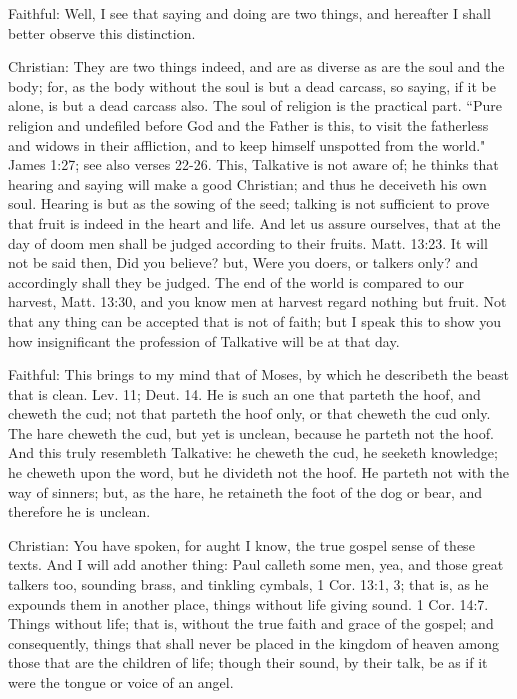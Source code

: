 Faithful: Well, I see that saying and doing are two things, and hereafter I shall better observe this distinction.

Christian: They are two things indeed, and are as diverse as are the soul and the body; for, as the body without the soul is but a dead carcass, so saying, if it be alone, is but a dead carcass also. The soul of religion is the practical part. ``Pure religion and undefiled before God and the Father is this, to visit the fatherless and widows in their affliction, and to keep himself unspotted from the world." James 1:27; see also verses 22-26. This, Talkative is not aware of; he thinks that hearing and saying will make a good Christian; and thus he deceiveth his own soul. Hearing is but as the sowing of the seed; talking is not sufficient to prove that fruit is indeed in the heart and life. And let us assure ourselves, that at the day of doom men shall be judged according to their fruits. Matt. 13:23. It will not be said then, Did you believe? but, Were you doers, or talkers only? and accordingly shall they be judged. The end of the world is compared to our harvest, Matt. 13:30, and you know men at harvest regard nothing but fruit. Not that any thing can be accepted that is not of faith; but I speak this to show you how insignificant the profession of Talkative will be at that day.

Faithful: This brings to my mind that of Moses, by which he describeth the beast that is clean. Lev. 11; Deut. 14. He is such an one that parteth the hoof, and cheweth the cud; not that parteth the hoof only, or that cheweth the cud only. The hare cheweth the cud, but yet is unclean, because he parteth not the hoof. And this truly resembleth Talkative: he cheweth the cud, he seeketh knowledge; he cheweth upon the word, but he divideth not the hoof. He parteth not with the way of sinners; but, as the hare, he retaineth the foot of the dog or bear, and therefore he is unclean.

Christian: You have spoken, for aught I know, the true gospel sense of these texts. And I will add another thing: Paul calleth some men, yea, and those great talkers too, sounding brass, and tinkling cymbals, 1 Cor. 13:1, 3; that is, as he expounds them in another place, things without life giving sound. 1 Cor. 14:7. Things without life; that is, without the true faith and grace of the gospel; and consequently, things that shall never be placed in the kingdom of heaven among those that are the children of life; though their sound, by their talk, be as if it were the tongue or voice of an angel.

